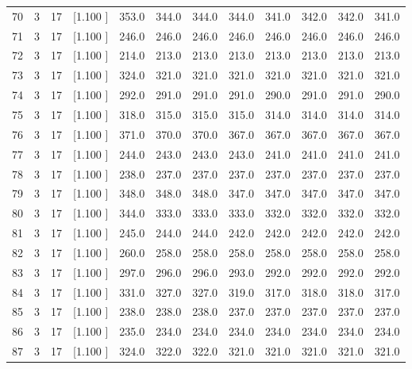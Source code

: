 \documentclass[12pt,a4paper]{article}
\begin{document}
\begin{center}
{\begin{tabular}{r r r r r r r r r r r r}
  70&  3& 17&[1.100     ]&   353.0&   344.0&   344.0&   344.0&   341.0&   342.0&   342.0&   341.0\\[-0.02in]
  71&  3& 17&[1.100     ]&   246.0&   246.0&   246.0&   246.0&   246.0&   246.0&   246.0&   246.0\\[-0.02in]
  72&  3& 17&[1.100     ]&   214.0&   213.0&   213.0&   213.0&   213.0&   213.0&   213.0&   213.0\\[-0.02in]
  73&  3& 17&[1.100     ]&   324.0&   321.0&   321.0&   321.0&   321.0&   321.0&   321.0&   321.0\\[-0.02in]
  74&  3& 17&[1.100     ]&   292.0&   291.0&   291.0&   291.0&   290.0&   291.0&   291.0&   290.0\\[-0.02in]
  75&  3& 17&[1.100     ]&   318.0&   315.0&   315.0&   315.0&   314.0&   314.0&   314.0&   314.0\\[-0.02in]
  76&  3& 17&[1.100     ]&   371.0&   370.0&   370.0&   367.0&   367.0&   367.0&   367.0&   367.0\\[-0.02in]
  77&  3& 17&[1.100     ]&   244.0&   243.0&   243.0&   243.0&   241.0&   241.0&   241.0&   241.0\\[-0.02in]
  78&  3& 17&[1.100     ]&   238.0&   237.0&   237.0&   237.0&   237.0&   237.0&   237.0&   237.0\\[-0.02in]
  79&  3& 17&[1.100     ]&   348.0&   348.0&   348.0&   347.0&   347.0&   347.0&   347.0&   347.0\\[-0.02in]
  80&  3& 17&[1.100     ]&   344.0&   333.0&   333.0&   333.0&   332.0&   332.0&   332.0&   332.0\\[-0.02in]
  81&  3& 17&[1.100     ]&   245.0&   244.0&   244.0&   242.0&   242.0&   242.0&   242.0&   242.0\\[-0.02in]
  82&  3& 17&[1.100     ]&   260.0&   258.0&   258.0&   258.0&   258.0&   258.0&   258.0&   258.0\\[-0.02in]
  83&  3& 17&[1.100     ]&   297.0&   296.0&   296.0&   293.0&   292.0&   292.0&   292.0&   292.0\\[-0.02in]
  84&  3& 17&[1.100     ]&   331.0&   327.0&   327.0&   319.0&   317.0&   318.0&   318.0&   317.0\\[-0.02in]
  85&  3& 17&[1.100     ]&   238.0&   238.0&   238.0&   237.0&   237.0&   237.0&   237.0&   237.0\\[-0.02in]
  86&  3& 17&[1.100     ]&   235.0&   234.0&   234.0&   234.0&   234.0&   234.0&   234.0&   234.0\\[-0.02in]
  87&  3& 17&[1.100     ]&   324.0&   322.0&   322.0&   321.0&   321.0&   321.0&   321.0&   321.0\\[-0.02in]

\end{tabular}}
\end{center}
\end{document}
